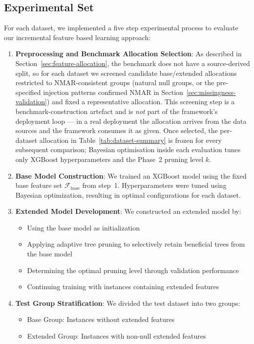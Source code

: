 \documentclass[sigconf]{acmart}
\begin{document}
\begin{itemize}
\begin{table}[h]
\end{table}


\subsection{Experimental Set}
For each dataset, we implemented a five step experimental process to evaluate our incremental feature based learning approach:

\begin{enumerate}
\item \textbf{Preprocessing and Benchmark Allocation Selection}: As described in Section~\ref{sec:feature-allocation}, the benchmark does not have a source-derived split, so for each dataset we screened candidate base/extended allocations restricted to NMAR-consistent groups (natural null groups, or the pre-specified injection patterns confirmed NMAR in Section~\ref{sec:missingness-validation}) and fixed a representative allocation. This screening step is a benchmark-construction artefact and is \emph{not} part of the framework's deployment loop --- in a real deployment the allocation arrives from the data sources and the framework consumes it as given. Once selected, the per-dataset allocation in Table~\ref{tab:dataset-summary} is frozen for every subsequent comparison; Bayesian optimisation inside each evaluation tunes only XGBoost hyperparameters and the Phase~2 pruning level $k$.

\item \textbf{Base Model Construction}: We trained an XGBoost model using the fixed base feature set $\mathcal{F}_{\text{base}}$ from step~1. Hyperparameters were tuned using Bayesian optimization, resulting in optimal configurations for each dataset.

\item \textbf{Extended Model Development}: We constructed an extended model by:
\begin{itemize}
    \item Using the base model as initialization
    \item Applying adaptive tree pruning to selectively retain beneficial trees from the base model
    \item Determining the optimal pruning level through validation performance
    \item Continuing training with instances containing extended features
\end{itemize}

\item \textbf{Test Group Stratification}: We divided the test dataset into two groups:
\begin{itemize}
    \item Base Group: Instances without extended features
    \item Extended Group: Instances with non-null extended features
\end{itemize}


\end{enumerate}
\end{itemize}
\end{document}
